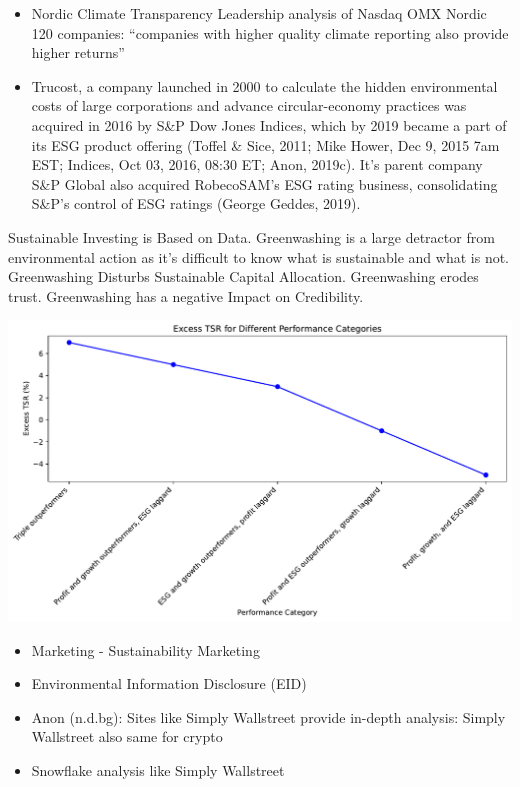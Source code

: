 \documentclass[
  letterpaper,
  DIV=11,
  numbers=noendperiod]{scrartcl}
\providecommand{\tightlist}{%
  \setlength{\itemsep}{0pt}\setlength{\parskip}{0pt}}\usepackage{longtable,booktabs,array}
\begin{document}
\begin{itemize}
\tightlist
\item
  Nordic Climate Transparency Leadership analysis of Nasdaq OMX Nordic
  120 companies: ``companies with higher quality climate reporting also
  provide higher returns''
\item
  Trucost, a company launched in 2000 to calculate the hidden
  environmental costs of large corporations and advance circular-economy
  practices was acquired in 2016 by S\&P Dow Jones Indices, which by
  2019 became a part of its ESG product offering (Toffel \& Sice, 2011;
  Mike Hower, Dec 9, 2015 7am EST; Indices, Oct 03, 2016, 08:30 ET;
  Anon, 2019c). It's parent company S\&P Global also acquired
  RobecoSAM's ESG rating business, consolidating S\&P's control of ESG
  ratings (George Geddes, 2019).
\end{itemize}

Sustainable Investing is Based on Data. Greenwashing is a large
detractor from environmental action as it's difficult to know what is
sustainable and what is not. Greenwashing Disturbs Sustainable Capital
Allocation. Greenwashing erodes trust. Greenwashing has a negative
Impact on Credibility.

\includegraphics{_thesis_files/figure-pdf/cell-50-output-1.pdf}

\begin{itemize}
\item
  Marketing - Sustainability Marketing
\item
  Environmental Information Disclosure (EID)
\item
  Anon (n.d.bg): Sites like Simply Wallstreet provide in-depth analysis:
  Simply Wallstreet also same for crypto
\item
  Snowflake analysis like Simply Wallstreet
\end{itemize}
\end{document}
